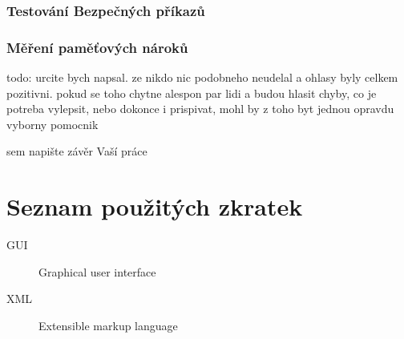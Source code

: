 \documentclass[thesis=M,czech]{FITthesis}[2012/06/26]
\begin{document}
\subsection{Testování Bezpečných příkazů}

\subsection{Měření paměťových nároků}

%
%
\begin{conclusion}

	todo: urcite bych napsal. ze nikdo nic podobneho neudelal a ohlasy byly celkem pozitivni. pokud se toho chytne alespon par lidi a budou hlasit chyby, co je potreba vylepsit, nebo dokonce i prispivat, mohl by z toho byt jednou opravdu vyborny pomocnik

	sem napište závěr Vaší práce
\end{conclusion}







\appendix

\chapter{Seznam použitých zkratek}
\begin{description}
	\item[GUI] Graphical user interface
	\item[XML] Extensible markup language
\end{description}
\end{document}
